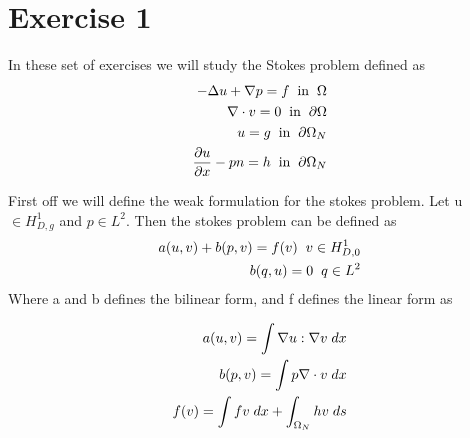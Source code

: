 \documentclass[a4paper,norsk]{article}
\begin{document}
\maketitle

\section{Exercise 1}
In these set of exercises we will study the Stokes problem defined as
\begin{align*}
-\Delta u + \nabla p = f \hspace{2mm} \text{in} \hspace{2mm} \Omega \\
\nabla \cdot v = 0 \hspace{2mm} \text{in} \hspace{2mm} \partial\Omega \\
u = g \hspace{2mm} \text{in} \hspace{2mm} \partial\Omega_N \\
\frac{\partial u}{\partial x} - pn = h \hspace{2mm} \text{in} \hspace{2mm} \partial\Omega_N\\
\end{align*}

First off we will define the weak formulation for the stokes problem. Let u $\in H_{D,g}^1$ and $p \in L^2$. Then
the stokes problem can be defined as
\begin{align*}
a(u, v) + b(p, v) = f(v) \hspace{2mm} v \in H_{D,0}^1 \\
b(q, u) = 0 \hspace{2mm} q \in L^2
\end{align*}
Where a and b defines the bilinear form, and f defines the linear form as

\begin{align*}
a(u, v) = \int \nabla u : \nabla v \hspace{1mm} dx \\
b(p, v) = \int p \nabla \cdot v \hspace{1mm} dx \\
f(v) = \int f v \hspace{1mm} dx + \int_{\Omega_N} h v \hspace{1mm} ds
\end{align*}
\end{document}
